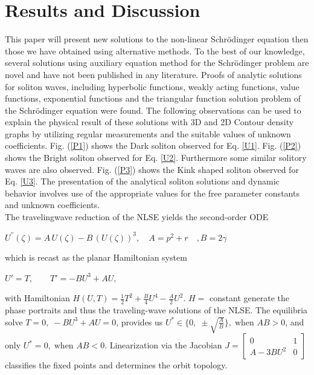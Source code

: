 \documentclass{article}
\numberwithin{equation}{section}
\begin{document}
\section{Results and Discussion}\label{s4}
\noindent This paper will present new solutions to the non-linear Schr\"{o}dinger equation then those we have obtained using alternative methods. To the best of our knowledge, several solutions using  auxiliary equation method for the Schr\"{o}dinger problem are novel and have not been published in any literature. Proofs of analytic solutions for soliton waves, including hyperbolic functions, weakly acting functions, value functions, exponential functions and the triangular function solution problem of the Schr\"{o}dinger equation were found. The following observations can be used to explain the physical result of these solutions with 3D and 2D Contour density graphs by utilizing regular measurements and the suitable values of unknown coefficients. Fig. (\ref{P1}) shows the Dark soliton observed for Eq. \ref{U1}. Fig. (\ref{P2})  shows the Bright soliton  observed for Eq. \ref{U2}. Furthermore some similar solitory waves are also observed. Fig. (\ref{P3})  shows the Kink shaped soliton observed for Eq. \ref{U3}. The presentation of the analytical soliton solutions and dynamic behavior involves use of the appropriate values for the free parameter constants and unknown coefficients.\\
The travelingwave reduction of the NLSE yields the second-order ODE
\begin{center}
    $U^{''}{(\zeta)}=A\,U \! \left(\zeta \right)-B\,\! \left(U \! \left(\zeta \right)\right)^{3},\quad A=p^2+r\quad, B=2\gamma$
\end{center}
which is recast as the planar Hamiltonian system
\begin{center}
    $U' = T, \qquad T' = -BU^3 + AU,$
\end{center}
with Hamiltonian $H(U,T) = \tfrac{1}{2}T^2 + \tfrac{B}{4}U^4 - \tfrac{A}{2}U^2.$ $H=$ constant generate the phase portraits and thus the traveling-wave solutions of the NLSE. The equilibria solve $T = 0, \; -BU^3 + AU = 0$, provides us $U^\ast \in \Big\{ 0, \; \pm \sqrt{\tfrac{A}{B}} \Big\}, \; \text{when } AB>0$,
and only $U^\ast = 0, \; \text{when } AB<0.$
Linearization via the Jacobian
    $J =
    \begin{bmatrix}
        0 & 1 \\
        A - 3B U^2 & 0
    \end{bmatrix}$
classifies the fixed points and determines the orbit topology.
\end{document}

